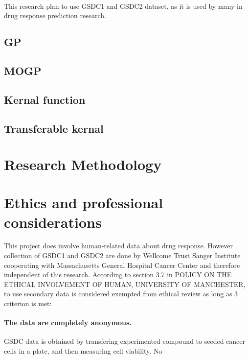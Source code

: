 \documentclass{article}
\begin{document}
\paragraph{}
This research plan to use GSDC1 and GSDC2 dataset, as it is used by many in drug response prediction research.\cite{qiu2021machine,MOGP,xie2024learning}

\subsection{GP}


\subsection{MOGP}

\subsection{Kernal function}

\subsection{Transferable kernal}

\section{Research Methodology}


\section{Ethics and professional considerations}
\paragraph{}
This project does involve human-related data about drug response. However collection of GSDC1 and GSDC2 are done by Wellcome Trust Sanger Institute cooperating with Massachusetts General Hospital Cancer Center and therefore independent of this research. According to section 3.7 in POLICY ON THE ETHICAL INVOLVEMENT OF HUMAN, UNIVERSITY OF MANCHESTER, to use secondary data is considered exempted from ethical review as long as 3 criterion is met:

\paragraph{The data are completely anonymous.} GSDC data is obtained by transfering experimented compound to seeded cancer cells in a plate, and then measuring cell viability. No 
\end{document}
